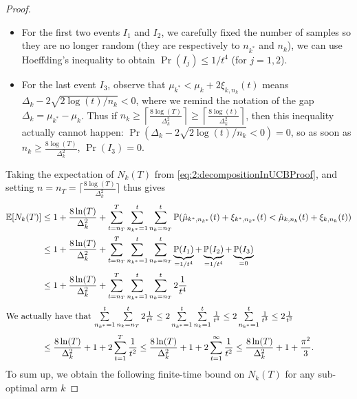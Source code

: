 \begin{proof}
    \begin{itemize}
        \item
        For the first two events $I_1$ and $I_2$, we carefully fixed the number of samples so they are no longer random (they are respectively to $n_{k^*}$ and $n_k$), we can use Hoeffding's inequality to obtain $\Pr(I_j) \leq 1 / t^{4}$ (for $j=1,2$).

        \item
        For the last event $I_3$,
        observe that $\mu_{k^*} < \mu_k + 2 \xi_{k,n_k}(t)$ means $\Delta_k - 2 \sqrt{2\log(t) / n_k} < 0$, where we remind the notation of the gap $\Delta_k = \mu_{k^*} - \mu_k$.
        Thus if $n_k \geq \left\lceil \frac{8 \log(T)}{\Delta_k^2} \right\rceil \geq \left\lceil \frac{8 \log(t)}{\Delta_k^2} \right\rceil$,
        then this inequality actually cannot happen:
        $\Pr(\Delta_k - 2 \sqrt{2\log(t) / n_k} < 0) = 0$,
        so as soon as $n_k \geq \frac{8 \log(T)}{\Delta_k^2}$, $\Pr(I_3) = 0$.
    \end{itemize}
    Taking the expectation of $N_k(T)$ from \eqref{eq:2:decompositionInUCBProof},
    and setting $n = n_T = \lceil \frac{8 \log(T)}{\Delta_k^2} \rceil$ thus gives
    \begin{align}\label{eq:2:decompositionInUCBProof2}
        \mathbb{E}[ N_k(T) ]
        & \leq 1 + \frac{8 \ln(T)}{\Delta_k^2} + \sum_{t=n_T}^T \sum_{n_{k^*}=1}^t \sum_{n_{k}=n_T}^t  \mathbb{P}( \hat{\mu}_{k^*,n_{k^*}}(t) + \xi_{k^*,n_{k^*}}(t) < \hat{\mu}_{k,n_k}(t) + \xi_{k,n_k}(t) ) \nonumber \\
        & \leq 1 + \frac{8 \ln(T)}{\Delta_k^2} + \sum_{t=n_T}^T \sum_{n_{k^*}=1}^t \sum_{n_{k}=n_T}^t  \underbrace{\mathbb{P}(I_1)}_{=1/t^4} + \underbrace{\mathbb{P}(I_2)}_{=1/t^4} + \underbrace{\mathbb{P}(I_3)}_{=0} \nonumber \\
        & \leq 1 + \frac{8 \ln(T)}{\Delta_k^2} + \sum_{t=n_T}^T \sum_{n_{k^*}=1}^t \sum_{n_{k}=n_T}^t  2 \frac{1}{t^4} \nonumber \\
        \intertext{We actually have that $\sum\limits_{n_{k^*}=1}^t \sum\limits_{n_{k}=n_T}^t  2 \frac{1}{t^4} \leq 2 \sum\limits_{n_{k^*}=1}^t \sum\limits_{n_{k}=1}^t \frac{1}{t^4} \leq 2 \sum\limits_{n_{k^*}=1}^t \frac{1}{t^3} \leq 2 \frac{1}{t^2}$}
        & \leq \frac{8 \ln(T)}{\Delta_k^2} + 1 + 2 \sum_{t=1}^T \frac{1}{t^2}
        \leq \frac{8 \ln(T)}{\Delta_k^2} + 1 + 2 \sum_{t=1}^{\infty} \frac{1}{t^2}
        \leq \frac{8 \ln(T)}{\Delta_k^2} + 1 + \frac{\pi^2}{3}.
    \end{align}
    To sum up, we obtain the following finite-time bound on $N_k(T)$ for any sub-optimal arm $k$

\end{proof}
